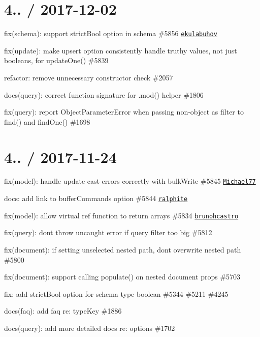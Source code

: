 \section*{4.. / 2017-\/12-\/02 }


\begin{DoxyItemize}
\item fix(schema)\+: support strict\+Bool option in schema \#5856 \href{https://github.com/ekulabuhov}{\tt ekulabuhov}
\item fix(update)\+: make upsert option consistently handle truthy values, not just booleans, for update\+One() \#5839
\item refactor\+: remove unnecessary constructor check \#2057
\item docs(query)\+: correct function signature for .mod() helper \#1806
\item fix(query)\+: report Object\+Parameter\+Error when passing non-\/object as filter to find() and find\+One() \#1698
\end{DoxyItemize}

\section*{4.. / 2017-\/11-\/24 }


\begin{DoxyItemize}
\item fix(model)\+: handle update cast errors correctly with bulk\+Write \#5845 \href{https://github.com/Michael77}{\tt Michael77}
\item docs\+: add link to buffer\+Commands option \#5844 \href{https://github.com/ralphite}{\tt ralphite}
\item fix(model)\+: allow virtual ref function to return arrays \#5834 \href{https://github.com/brunohcastro}{\tt brunohcastro}
\item fix(query)\+: don\textquotesingle{}t throw uncaught error if query filter too big \#5812
\item fix(document)\+: if setting unselected nested path, don\textquotesingle{}t overwrite nested path \#5800
\item fix(document)\+: support calling {\ttfamily populate()} on nested document props \#5703
\item fix\+: add {\ttfamily strict\+Bool} option for schema type boolean \#5344 \#5211 \#4245
\item docs(faq)\+: add faq re\+: type\+Key \#1886
\item docs(query)\+: add more detailed docs re\+: options \#1702
\end{DoxyItemize}

